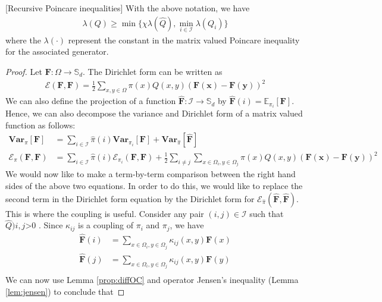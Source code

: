 \begin{lemma}{[Recursive Poincare inequalities]}\label{lem:recPI} With the above notation, we have
  \begin{align*}\lambda(Q) \geq \min\big\{\chi\lambda(\hat{Q}),\min\limits_{i \in \mathcal{I}}\lambda(Q_i)\big\}
  \end{align*}
  where the $\lambda(\cdot)$ represent the constant in the matrix valued Poincare inequality for the associated generator.
\end{lemma}
\begin{proof}
  Let $\mathbf{F}:\Omega \rightarrow \mathbb{S}_d$. The Dirichlet form can be written as
  \begin{align*}
    \mathcal{E}(\mathbf{F},\mathbf{F}) = \frac{1}{2}\sum\limits_{x,y\in\Omega}\pi(x)Q(x,y)(\mathbf{F(x)}-\mathbf{F(y)})^2
\end{align*}
We can also define the projection of a function $\hat{\mathbf{F}}:\mathcal{I}\rightarrow \mathbb{S}_d$ by $\hat{\mathbf{F}}(i)=\mathbb{E}_{\pi_i}[\mathbf{F}]$. Hence, we can also decompose the variance and Dirichlet form of a matrix valued function as follows:
\begin{align*}
  \mathbf{Var}_\pi[\mathbf{F}]&=\sum\limits_{i \in \mathcal{I}}\hat{\pi}(i)\mathbf{Var}_{\pi_i}[\mathbf{F}] + \mathbf{Var}_{\hat{\pi}}[\hat{\mathbf{F}}]\\
  \mathcal{E}_\pi(\mathbf{F},\mathbf{F}) &= \sum\limits_{i \in \mathcal{I}}\hat{\pi}(i)\mathcal{E}_{\pi_i}(\mathbf{F},\mathbf{F})+\frac{1}{2}\sum\limits_{i \neq j}\sum\limits_{x\in\Omega_i, y \in \Omega_j}\pi(x)Q(x,y)(\mathbf{F(x)}-\mathbf{F(y)})^2
\end{align*}
We would now like to make a term-by-term comparison between the right hand sides of the above two equations. In order to do this, we would like to replace the second term in the Dirichlet form equation by the Dirichlet form for $\mathcal{E}_{\hat{\pi}}(\mathbf{\hat{F}},\mathbf{\hat{F}})$. This is where the coupling is useful. Consider any pair $(i,j)\in\mathcal{I}$ such that $\hat{Q})i,j$>0
. Since $\kappa_{ij}$ is a coupling of $\pi_i$ and $\pi_j$, we have
\begin{align*}
  \mathbf{\hat{F}}(i) &= \sum\limits_{x\in\Omega_i,y\in\Omega_j}\kappa_{ij}(x,y)\mathbf{F}(x)\\
  \mathbf{\hat{F}}(j) &= \sum\limits_{x\in\Omega_i,y\in\Omega_j}\kappa_{ij}(x,y)\mathbf{F}(y)\\
\end{align*}
We can now use Lemma \ref{prop:diffOC} and operator Jensen's inequality (Lemma \ref{lem:jensen}) to conclude that

\end{proof}
